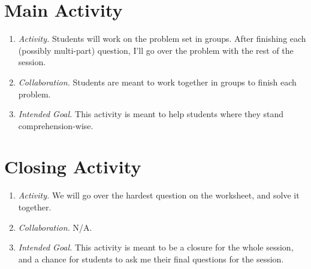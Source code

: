 \documentclass[11pt]{article}
\begin{document}
\section{\centering Main Activity}
	\begin{enumerate}
		\item \textit{Activity.} Students will work on the problem set in groups. After finishing each (possibly multi-part) question, I'll go over the problem with
						the rest of the session.
		\item \textit{Collaboration.} Students are meant to work together in groups to finish each problem.
		\item \textit{Intended Goal.} This activity is meant to help students where they stand comprehension-wise.
	\end{enumerate}

\section{\centering Closing Activity}
	\begin{enumerate}
		\item \textit{Activity.} We will go over the hardest question on the worksheet, and solve it together.
		\item \textit{Collaboration.} N/A.
		\item \textit{Intended Goal.} This activity is meant to be a closure for the whole session, and a chance for students to ask me their final questions for 
							the session.
	\end{enumerate}
\end{document}
